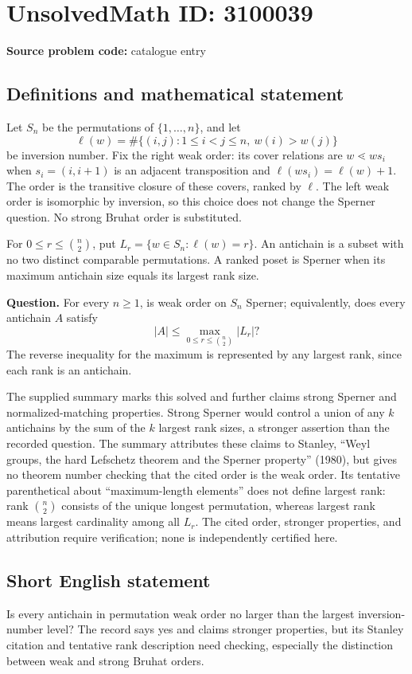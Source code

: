 \documentclass[11pt]{article}
\begin{document}
\section*{UnsolvedMath ID: 3100039}
\textbf{Source problem code:} catalogue entry
\subsection{Definitions and mathematical statement}
Let $S_n$ be the permutations of $\{1,\ldots,n\}$, and let
\[
 \ell(w)=\#\{(i,j):1\leq i<j\leq n,\ w(i)>w(j)\}
\]
be inversion number. Fix the right weak order: its cover relations are $w\lessdot ws_i$ when $s_i=(i,i+1)$ is an adjacent transposition and $\ell(ws_i)=\ell(w)+1$. The order is the transitive closure of these covers, ranked by $\ell$. The left weak order is isomorphic by inversion, so this choice does not change the Sperner question. No strong Bruhat order is substituted.

For $0\leq r\leq\binom n2$, put $L_r=\{w\in S_n:\ell(w)=r\}$. An antichain is a subset with no two distinct comparable permutations. A ranked poset is Sperner when its maximum antichain size equals its largest rank size.

\textbf{Question.} For every $n\geq1$, is weak order on $S_n$ Sperner; equivalently, does every antichain $A$ satisfy
\[
 |A|\leq\max_{0\leq r\leq\binom n2}|L_r|?
\]
The reverse inequality for the maximum is represented by any largest rank, since each rank is an antichain.

The supplied summary marks this solved and further claims strong Sperner and normalized-matching properties. Strong Sperner would control a union of any $k$ antichains by the sum of the $k$ largest rank sizes, a stronger assertion than the recorded question. The summary attributes these claims to Stanley, ``Weyl groups, the hard Lefschetz theorem and the Sperner property'' (1980), but gives no theorem number checking that the cited order is the weak order. Its tentative parenthetical about ``maximum-length elements'' does not define largest rank: rank $\binom n2$ consists of the unique longest permutation, whereas largest rank means largest cardinality among all $L_r$. The cited order, stronger properties, and attribution require verification; none is independently certified here.
\subsection{Short English statement}
Is every antichain in permutation weak order no larger than the largest inversion-number level? The record says yes and claims stronger properties, but its Stanley citation and tentative rank description need checking, especially the distinction between weak and strong Bruhat orders.
\end{document}
